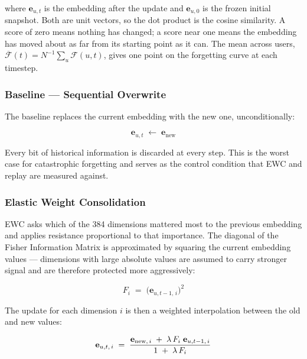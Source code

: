 \documentclass[conference]{IEEEtran}
\newcommand{\eb}{\mathbf{e}}
\newcommand{\lam}{\lambda}
\newcommand{\Fc}{\mathcal{F}}
\begin{document}
where $\eb_{u,t}$ is the embedding after the update and
$\eb_{u,0}$ is the frozen initial snapshot. Both are unit
vectors, so the dot product is the cosine similarity. A score
of zero means nothing has changed; a score near one means the
embedding has moved about as far from its starting point as
it can. The mean across users,
$\overline{\Fc}(t) = N^{-1}\sum_u \Fc(u,t)$, gives one
point on the forgetting curve at each timestep.

\subsubsection{Baseline --- Sequential Overwrite}

The baseline replaces the current embedding with the new one,
unconditionally:

\begin{equation}
  \eb_{u,t} \;\leftarrow\; \eb_{\mathrm{new}}
  \label{eq:baseline}
\end{equation}

Every bit of historical information is discarded at every
step. This is the worst case for catastrophic forgetting and
serves as the control condition that EWC and replay are
measured against.

\subsubsection{Elastic Weight Consolidation}

EWC asks which of the 384 dimensions mattered most to the
previous embedding and applies resistance proportional to
that importance. The diagonal of the Fisher Information Matrix
is approximated by squaring the current embedding values ---
dimensions with large absolute values are assumed to carry
stronger signal and are therefore protected more aggressively:

\begin{equation}
  F_i
  \;=\;
  \bigl(\eb_{u,t-1,\,i}\bigr)^{2}
  \label{eq:fisher}
\end{equation}

The update for each dimension $i$ is then a weighted
interpolation between the old and new values:

\begin{equation}
  \eb_{u,t,\,i}
  \;=\;
  \frac{%
    \eb_{\mathrm{new},\,i}
    \;+\; \lam\,F_i\;\eb_{u,t-1,\,i}
  }{%
    1 \;+\; \lam\,F_i
  }
  \label{eq:ewc}
\end{equation}
\end{document}
